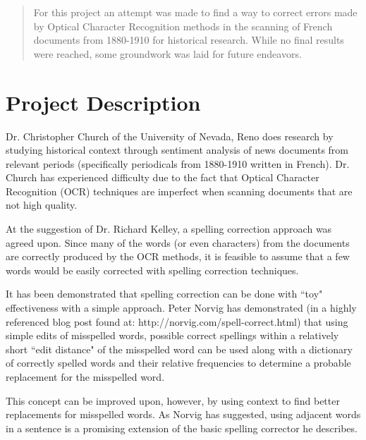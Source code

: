 \documentclass[11pts]{article}
\begin{document}
\maketitle

\begin{abstract}
For this project an attempt was made to find a way to correct errors made by Optical Character Recognition methods in the scanning of French documents from 1880-1910 for historical research. While no final results were reached, some groundwork was laid for future endeavors.
\end{abstract}
\newpage

\section{Project Description}
Dr. Christopher Church of the University of Nevada, Reno does research by studying historical context through sentiment analysis of news documents from relevant periods (specifically periodicals from 1880-1910 written in French). Dr. Church has experienced difficulty due to the fact that Optical Character Recognition (OCR) techniques are imperfect when scanning documents that are not high quality.

At the suggestion of Dr. Richard Kelley, a spelling correction approach was agreed upon. Since many of the words (or even characters) from the documents are correctly produced by the OCR methods, it is feasible to assume that a few words would be easily corrected with spelling correction techniques.

It has been demonstrated that spelling correction can be done with ``toy" effectiveness with a simple approach. Peter Norvig has demonstrated (in a highly referenced blog post found at: http://norvig.com/spell-correct.html) that using simple edits of misspelled words, possible correct spellings within a relatively short ``edit distance" of the misspelled word can be used along with a dictionary of correctly spelled words and their relative frequencies to determine a probable replacement for the misspelled word.

This concept can be improved upon, however, by using context to find better replacements for misspelled words. As Norvig has suggested, using adjacent words in a sentence is a promising extension of the basic spelling corrector he describes.
\end{document}
